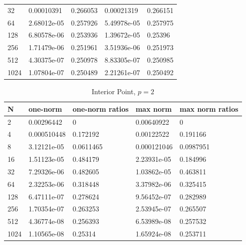 \documentclass{article} %
\theoremstyle{plain}
\numberwithin{equation}{section} %
\numberwithin{figure}{section} %
\numberwithin{table}{section} %
\begin{document}
\begin{enumerate}[\ \ (a)]
\begin{table}
\begin{tabular}[ht!]{lllll}
                   32 & 0.00010391  &          0.266053 & 0.00021319  &          0.266151 \\
                   64 & 2.68012e-05 &          0.257926 & 5.49978e-05 &          0.257975 \\
                  128 & 6.80578e-06 &          0.253936 & 1.39672e-05 &          0.25396  \\
                  256 & 1.71479e-06 &          0.251961 & 3.51936e-06 &          0.251973 \\
                  512 & 4.30375e-07 &          0.250978 & 8.83305e-07 &          0.250985 \\
                 1024 & 1.07804e-07 &          0.250489 & 2.21261e-07 &          0.250492 \\
                \hline
            \end{tabular}
        \end{table}
        \begin{table}
            \centering
            \caption{Interior Point, $p=2$}
            \begin{tabular}[ht!]{lllll}
                \hline
                    N &    one-norm &   one-norm ratios &    max norm &   max norm ratios \\
                \hline
                    2 & 0.00296442  &         0         & 0.00640922  &         0         \\
                    4 & 0.000510448 &         0.172192  & 0.00122522  &         0.191166  \\
                    8 & 3.12121e-05 &         0.0611465 & 0.000121046 &         0.0987951 \\
                   16 & 1.51123e-05 &         0.484179  & 2.23931e-05 &         0.184996  \\
                   32 & 7.29326e-06 &         0.482605  & 1.03862e-05 &         0.463811  \\
                   64 & 2.32253e-06 &         0.318448  & 3.37982e-06 &         0.325415  \\
                  128 & 6.47111e-07 &         0.278624  & 9.56452e-07 &         0.282989  \\
                  256 & 1.70354e-07 &         0.263253  & 2.53945e-07 &         0.265507  \\
                  512 & 4.36774e-08 &         0.256393  & 6.53989e-08 &         0.257532  \\
                 1024 & 1.10565e-08 &         0.25314   & 1.65924e-08 &         0.253711  \\
                \hline
            \end{tabular}
        \end{table}
\end{enumerate}
\end{document}
